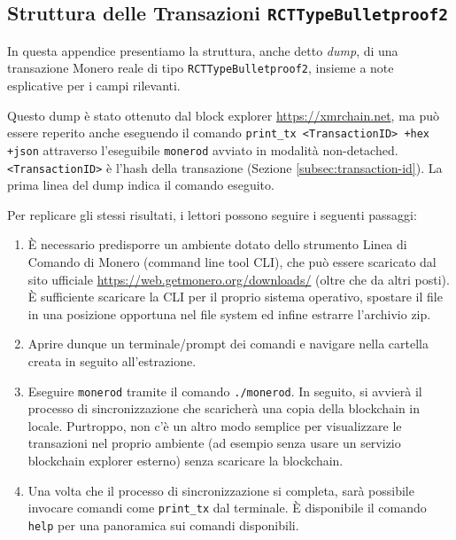 \begin{appendices}

\renewcommand{\theFancyVerbLine}{%
	\textcolor{red}{\small
		\arabic{FancyVerbLine}}}

\chapter{Struttura delle Transazioni {\tt RCTTypeBulletproof2}}
\label{appendix:RCTTypeBulletproof2}

In questa appendice presentiamo la struttura, anche detto \emph{dump}, di una transazione Monero reale di tipo {\tt RCTTypeBulletproof2}, insieme a note esplicative per i campi rilevanti.

Questo dump è stato ottenuto dal block explorer \url{https://xmrchain.net}, ma può essere reperito anche eseguendo il comando {\tt print\_tx <TransactionID> +hex +json} attraverso l'eseguibile {\tt monerod} avviato in modalità non-detached. {\tt <TransactionID>} è l'hash della transazione (Sezione \ref{subsec:transaction-id}). La prima linea del dump indica il comando eseguito.%

Per replicare gli stessi risultati, i lettori possono seguire i seguenti passaggi:%
\begin{enumerate}
    \item È necessario predisporre un ambiente dotato dello strumento Linea di Comando di Monero (command line tool CLI), che può essere scaricato dal sito ufficiale \url{https://web.getmonero.org/downloads/} (oltre che da altri posti). È sufficiente scaricare la CLI per il proprio sistema operativo, spostare il file in una posizione opportuna nel file system ed infine estrarre l'archivio zip.
    \item Aprire dunque un terminale/prompt dei comandi e navigare nella cartella creata in seguito all'estrazione.
    \item Eseguire {\tt monerod} tramite il comando {\tt ./monerod}. In seguito, si avvierà il processo di sincronizzazione che scaricherà una copia della blockchain in locale. Purtroppo, non c'è un altro modo semplice per visualizzare le transazioni nel proprio ambiente (ad esempio senza usare un servizio blockchain explorer esterno) senza scaricare la blockchain.
    \item Una volta che il processo di sincronizzazione si completa, sarà possibile invocare comandi come {\tt print\_tx} dal terminale. È disponibile il comando {\tt help} per una panoramica sui comandi disponibili.
\end{enumerate}


\end{appendices}
